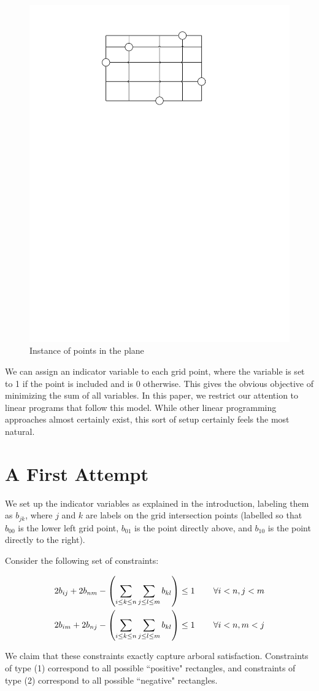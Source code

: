 \documentclass[11pt]{article}
\begin{document}
\begin{figure}
\centering
\includegraphics[width=0.3\linewidth]{instance.pdf}
\caption{Instance of points in the plane}
\label{fig:instance}
\end{figure}

We can assign an indicator variable to each grid point, where the variable is set to 1 if the point is included and is 0 otherwise. This gives the obvious objective of minimizing the sum of all variables. In this paper, we restrict our attention to linear programs that follow this model. While other linear programming approaches almost certainly exist, this sort of setup certainly feels the most natural.

\section{A First Attempt}

We set up the indicator variables as explained in the introduction, labeling them as $b_{jk}$, where $j$ and $k$ are labels on the grid intersection points (labelled so that $b_{00}$ is the lower left grid point, $b_{01}$ is the point directly above, and $b_{10}$ is the point directly to the right).

Consider the following set of constraints:

\begin{align}
2b_{ij} + 2b_{nm} - \left(\sum_{i \leq k \leq n}\sum_{j\leq l \leq m} b_{kl}\right) &\leq 1  \hspace{.3in} \forall i<n, j<m \\
2b_{im} + 2b_{nj} - \left(\sum_{i \leq k \leq n}\sum_{j\leq l \leq m} b_{kl}\right)  &\leq 1  \hspace{.3in} \forall i<n, m<j
\end{align}

We claim that these constraints exactly capture arboral satisfaction. Constraints of type (1) correspond to all possible ``positive" rectangles, and constraints of type (2) correspond to all possible ``negative" rectangles.
\end{document}
